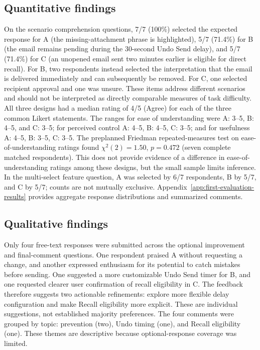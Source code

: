 \documentclass[letterpaper]{jdf}
\begin{document}
\subsection{Quantitative findings}
On the scenario comprehension questions, 7/7 (100\%) selected the expected response for A (the missing-attachment phrase is highlighted), 5/7 (71.4\%) for B (the email remains pending during the 30-second Undo Send delay), and 5/7 (71.4\%) for C (an unopened email sent two minutes earlier is eligible for direct recall). For B, two respondents instead selected the interpretation that the email is delivered immediately and can subsequently be removed. For C, one selected recipient approval and one was unsure. These items address different scenarios and should not be interpreted as directly comparable measures of task difficulty.
All three designs had a median rating of 4/5 (Agree) for each of the three common Likert statements. The ranges for ease of understanding were A: 3--5, B: 4--5, and C: 3--5; for perceived control A: 4--5, B: 4--5, C: 3--5; and for usefulness A: 4--5, B: 3--5, C: 3--5. The preplanned Friedman repeated-measures test on ease-of-understanding ratings found $\chi^2(2)=1.50$, $p=0.472$ (seven complete matched respondents). This does not provide evidence of a difference in ease-of-understanding ratings among these designs, but the small sample limits inference. In the multi-select feature question, A was selected by 6/7 respondents, B by 5/7, and C by 5/7; counts are not mutually exclusive. Appendix~\ref{app:first-evaluation-results} provides aggregate response distributions and summarized comments.
\subsection{Qualitative findings}
Only four free-text responses were submitted across the optional improvement and final-comment questions. One respondent praised A without requesting a change, and another expressed enthusiasm for its potential to catch mistakes before sending. One suggested a more customizable Undo Send timer for B, and one requested clearer user confirmation of recall eligibility in C. The feedback therefore suggests two actionable refinements: explore more flexible delay configuration and make Recall eligibility more explicit. These are individual suggestions, not established majority preferences. The four comments were grouped by topic: prevention (two), Undo timing (one), and Recall eligibility (one). These themes are descriptive because optional-response coverage was limited.
\end{document}
